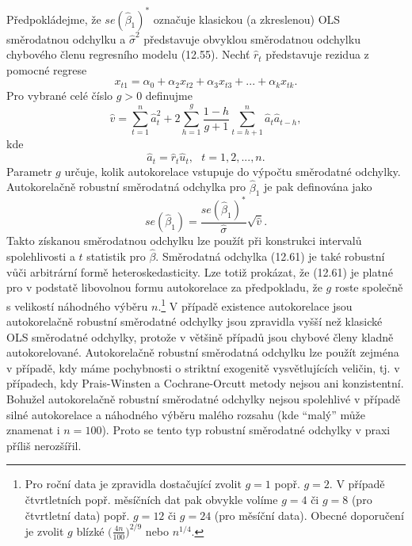 Předpokládejme, že $se(\hat{\beta}_1)^*$ označuje klasickou (a zkreslenou) OLS směrodatnou odchylku a $\hat{\sigma}^2$ představuje obvyklou směrodatnou odchylku chybového členu regresního modelu (12.55). Nechť $\hat{r}_t$ představuje rezidua z pomocné regrese
\begin{equation}
x_{t1} = \alpha_0 + \alpha_2 x_{t2} + \alpha_3 x_{t3} + ... + \alpha_k x_{tk}.
\end{equation}
Pro vybrané celé číslo $g > 0$ definujme
\begin{equation}
\hat{v} = \sum_{t = 1}^n \hat{a}_t^2 + 2 \sum_{h = 1}^g \frac{1 - h}{g + 1}\sum_{t = h + 1}^n \hat{a}_t \hat{a}_{t - h},
\end{equation}
kde
\begin{equation}
\hat{a}_t = \hat{r}_t \hat{u}_t, ~~~ t = 1, 2, ..., n.
\end{equation}
Parametr $g$ určuje, kolik autokorelace vstupuje do výpočtu směrodatné odchylky. Autokorelačně robustní směrodatná odchylka pro $\hat{\beta}_1$ je pak definována jako
\begin{equation}
se(\hat{\beta}_1) = \frac{se(\hat{\beta}_1)^*}{\hat{\sigma}} \sqrt{\hat{v}}.
\end{equation}
Takto získanou směrodatnou odchylku lze použít při konstrukci intervalů spolehlivosti a $t$ statistik pro $\hat{\beta}$. Směrodatná odchylka (12.61) je také robustní vůči arbitrární formě heteroskedasticity. Lze totiž prokázat, že (12.61) je platné pro v podstatě libovolnou formu autokorelace za předpokladu, že $g$ roste společně s velikostí náhodného výběru $n$.\footnote{Pro roční data je zpravidla dostačující zvolit $g = 1$ popř. $g = 2$. V případě čtvrtletních popř. měsíčních dat pak obvykle volíme $g = 4$ či $g = 8$ (pro čtvrtletní data) popř. $g = 12$ či $g = 24$ (pro měsíční data). Obecné doporučení je zvolit $g$ blízké $\Big(\frac{4n}{100}\Big)^{2/9}$ nebo $n^{1/4}$.} V případě existence autokorelace jsou autokorelačně robustní směrodatné odchylky jsou zpravidla vyšší než klasické OLS směrodatné odchylky, protože v většině případů jsou chybové členy kladně autokorelované. Autokorelačně robustní směrodatná odchylku lze použít zejména v případě, kdy máme pochybnosti o striktní exogenitě vysvětlujících veličin, tj. v případech, kdy Prais-Winsten a Cochrane-Orcutt metody nejsou ani konzistentní. Bohužel autokorelačně robustní směrodatné odchylky nejsou spolehlivé v případě silné autokorelace a náhodného výběru malého rozsahu (kde ``malý'' může znamenat i $n = 100$). Proto se tento typ robustní směrodatné odchylky v praxi příliš nerozšířil. 


